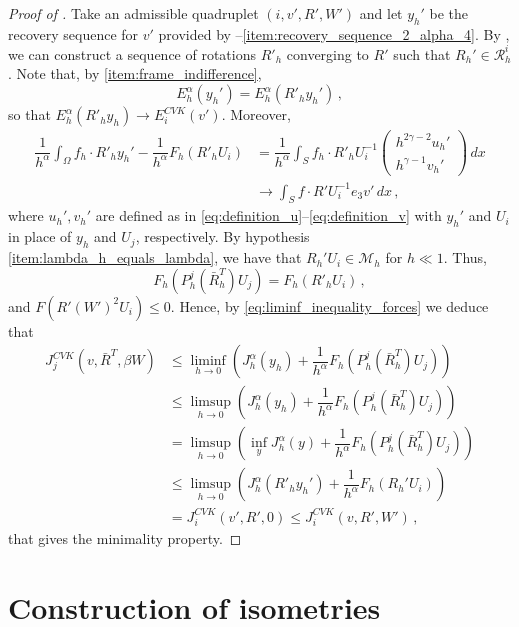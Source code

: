 \documentclass{article}
\theoremstyle{plain}
\theoremstyle{plain}
\theoremstyle{plain}
\theoremstyle{plain}
\theoremstyle{plain}
\theoremstyle{definition}
\theoremstyle{definition}
\begin{document}
\begin{proof}[Proof of ]
	Take an admissible quadruplet $(i, v', R', W')$ and let $y_h'$ be the recovery sequence for $v'$ provided by --\ref{item:recovery_sequence_2_alpha_4}. By , we can construct a sequence of rotations $R'_h$ converging to $R'$ such that $R_h' \in \mathcal{R}_h^i$. Note that, by \ref{item:frame_indifference},
	\[
		E_h^\alpha(y_h') = E_h^\alpha(R'_hy_h') \,,
	\]
	so that $E_h^\alpha(R'_h y_h) \to E_i^{CVK}(v')$. Moreover,
	\begin{align}
		\dfrac{1}{h^\alpha} \int_\Omega f_h \cdot R'_h y_h' - \dfrac{1}{h^\alpha}F_h(R'_h U_i)&  = \dfrac{1}{h^\alpha} \int_S f_h \cdot R'_hU_i^{-1}\begin{pmatrix}
			h^{2\gamma - 2}u_h' \\ h^{\gamma - 1} v_h'
		\end{pmatrix} \, dx \\
		& \to \int_S f \cdot R' U_i^{-1} e_3 v' \, dx \,,
	\end{align}
	where $u_h', v_h'$ are defined as in \eqref{eq:definition_u}--\eqref{eq:definition_v} with $y_h'$ and $U_i$ in place of $y_h$ and $U_j$, respectively. By hypothesis \ref{item:lambda_h_equals_lambda}, we have that $R_h'U_i \in \mathcal{M}_h$ for $h \ll 1$. Thus,
	\[
		F_h(P_h^j(\bar R_h^T)U_j) = F_h(R'_h U_i) \,,
	\]
	and $F(R'(W')^2U_i) \leq 0$. Hence, by \eqref{eq:liminf_inequality_forces} we deduce that
	\begin{align}
		J_j^{CVK}(v, \bar R^T, \beta W) & \leq \liminf_{h \to 0} \left(J_h^\alpha(y_h) + \dfrac{1}{h^\alpha}F_h(P_h^j(\bar R_h^T)U_j)\right)\\
		& \leq \limsup_{h \to 0} \left(J_h^\alpha(y_h) + \dfrac{1}{h^\alpha} F_h(P_h^j(\bar R_h^T)U_j)\right) \\
		& = \limsup_{h \to 0} \left(\inf_y J_h^\alpha(y) + \dfrac{1}{h^\alpha} F_h(P_h^j(\bar R_h^T)U_j)\right)\\
		& \leq \limsup_{h \to 0} \left(J_h^\alpha(R'_h y_h') + \dfrac{1}{h^\alpha} F_h(R_h'U_i)\right) \\
		& = J_i^{CVK}(v', R', 0) \leq J_i^{CVK}(v, R', W') \,,
	\end{align}
	that gives the minimality property.
\end{proof}


\appendix

\section{Construction of isometries}\label{app:appendix}
\end{document}

